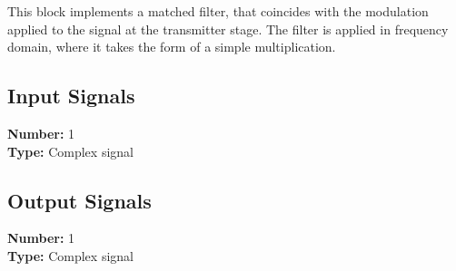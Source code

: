 This block implements a matched filter, that coincides with the modulation applied to the signal at the transmitter stage. The filter is applied in frequency domain, where it takes the form of a simple multiplication.

\subsection*{Input Signals}

\textbf{Number:} 1\\
\textbf{Type:} Complex signal

\subsection*{Output Signals}

\textbf{Number:} 1\\
\textbf{Type:} Complex signal

